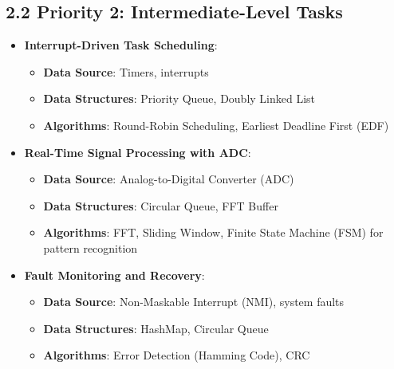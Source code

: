 \documentclass{article}
\begin{document}
\subsection*{2.2 Priority 2: Intermediate-Level Tasks}
\begin{itemize}
    \item \textbf{Interrupt-Driven Task Scheduling}:
    \begin{itemize}
        \item \textbf{Data Source}: Timers, interrupts
        \item \textbf{Data Structures}: Priority Queue, Doubly Linked List
        \item \textbf{Algorithms}: Round-Robin Scheduling, Earliest Deadline First (EDF)
    \end{itemize}
    
    \item \textbf{Real-Time Signal Processing with ADC}:
    \begin{itemize}
        \item \textbf{Data Source}: Analog-to-Digital Converter (ADC)
        \item \textbf{Data Structures}: Circular Queue, FFT Buffer
        \item \textbf{Algorithms}: FFT, Sliding Window, Finite State Machine (FSM) for pattern recognition
    \end{itemize}
    
    \item \textbf{Fault Monitoring and Recovery}:
    \begin{itemize}
        \item \textbf{Data Source}: Non-Maskable Interrupt (NMI), system faults
        \item \textbf{Data Structures}: HashMap, Circular Queue
        \item \textbf{Algorithms}: Error Detection (Hamming Code), CRC
    \end{itemize}
\end{itemize}
\end{document}
